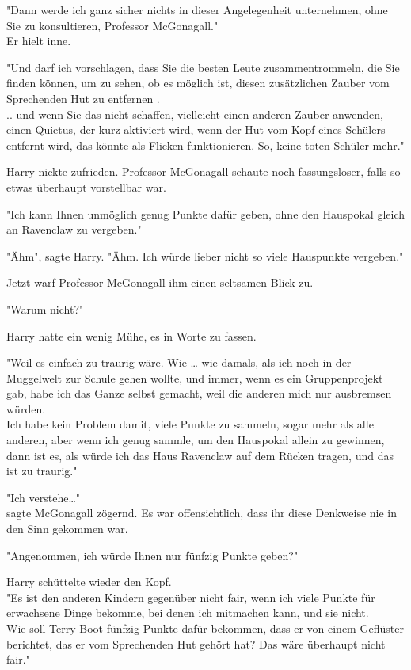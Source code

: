 {"Dann werde ich ganz sicher nichts in dieser Angelegenheit unternehmen, ohne Sie zu konsultieren, Professor McGonagall."\\ Er hielt inne.

"Und darf ich vorschlagen, dass Sie die besten Leute zusammentrommeln, die Sie finden können, um zu sehen, ob es möglich ist, diesen zusätzlichen Zauber vom Sprechenden Hut zu entfernen .\\ .. und wenn Sie das nicht schaffen, vielleicht einen anderen Zauber anwenden, einen Quietus, der kurz aktiviert wird, wenn der Hut vom Kopf eines Schülers entfernt wird, das könnte als Flicken funktionieren. So, keine toten Schüler mehr."

Harry nickte zufrieden. Professor McGonagall schaute noch fassungsloser, falls so etwas überhaupt vorstellbar war.

"Ich kann Ihnen unmöglich genug Punkte dafür geben, ohne den Hauspokal gleich an Ravenclaw zu vergeben."

"Ähm", sagte Harry. "Ähm. Ich würde lieber nicht so viele Hauspunkte vergeben."

Jetzt warf Professor McGonagall ihm einen seltsamen Blick zu.

"Warum nicht?"

Harry hatte ein wenig Mühe, es in Worte zu fassen.

"Weil es einfach zu traurig wäre. Wie … wie damals, als ich noch in der Muggelwelt zur Schule gehen wollte, und immer, wenn es ein Gruppenprojekt gab, habe ich das Ganze selbst gemacht, weil die anderen mich nur ausbremsen würden.\\ Ich habe kein Problem damit, viele Punkte zu sammeln, sogar mehr als alle anderen, aber wenn ich genug sammle, um den Hauspokal allein zu gewinnen, dann ist es, als würde ich das Haus Ravenclaw auf dem Rücken tragen, und das ist zu traurig."

"Ich verstehe…"\\ sagte McGonagall zögernd. Es war offensichtlich, dass ihr diese Denkweise nie in den Sinn gekommen war.

"Angenommen, ich würde Ihnen nur fünfzig Punkte geben?"

Harry schüttelte wieder den Kopf.\\ "Es ist den anderen Kindern gegenüber nicht fair, wenn ich viele Punkte für erwachsene Dinge bekomme, bei denen ich mitmachen kann, und sie nicht.\\ Wie soll Terry Boot fünfzig Punkte dafür bekommen, dass er von einem Geflüster berichtet, das er vom Sprechenden Hut gehört hat? Das wäre überhaupt nicht fair."

}
